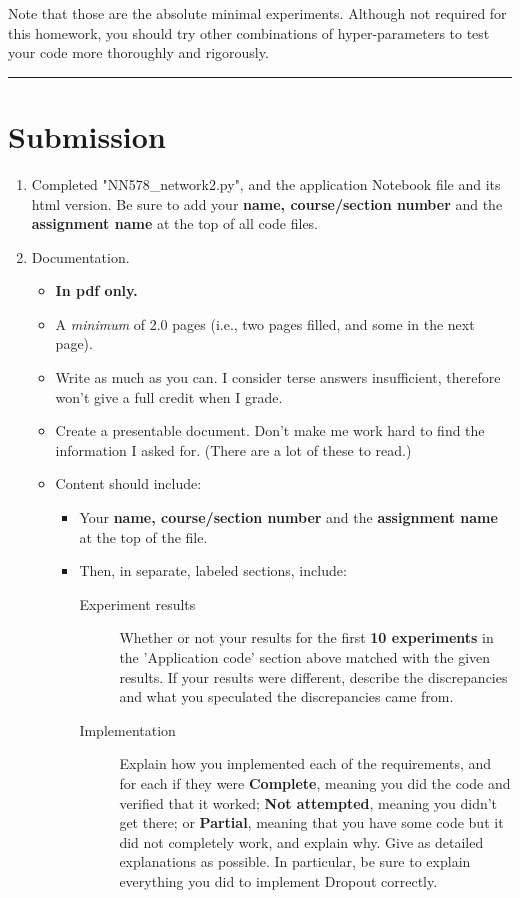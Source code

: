 \documentclass[11pt]{article}
\begin{document}
Note that those are the absolute minimal experiments.  Although not required for this homework, you should try other combinations of hyper-parameters to test your code more thoroughly and rigorously.

\noindent\rule{\textwidth}{0.5pt}
\section*{Submission}
\label{sec:orge96bef3}



\begin{enumerate}
\item Completed "NN578\_network2.py", and the application Notebook file and its html version.  Be sure to add your \textbf{name, course/section number} and the \textbf{assignment name} at the top of all code files.
\item Documentation. 
\begin{itemize}
\item \textbf{In pdf only.}
\item A \emph{minimum} of 2.0 pages (i.e., two pages filled, and some in the next page).
\item Write as much as you can.  I consider terse answers insufficient, therefore won't give a full credit when I grade.
\item Create a presentable document. Don't make me work hard to find the information I asked for. (There are a lot of these to read.)
\item Content should include:
\begin{itemize}
\item Your \textbf{name, course/section number} and the \textbf{assignment name} at the top of the file.
\item Then, in separate, labeled sections, include:
\begin{description}
\item[{Experiment results}] Whether or not your results for the first \textbf{10 experiments} in the 'Application code' section above matched with the given results.  If your results were different, describe the discrepancies and what you speculated the discrepancies came from.
\item[{Implementation}] Explain how you implemented each of the requirements, and for each if they were \textbf{Complete}, meaning you did the code and verified that it worked; \textbf{Not attempted}, meaning you didn't get there; or \textbf{Partial}, meaning that you have some code but it did not completely work, and explain why.  Give as detailed explanations as possible.  In particular, be sure to explain everything you did to implement Dropout correctly.

\end{description}
\end{itemize}
\end{itemize}
\end{enumerate}
\end{document}
